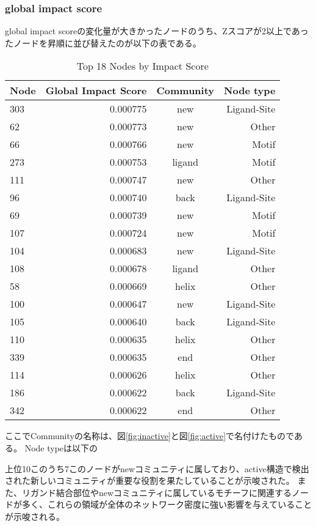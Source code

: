 \subsubsection{global impact score}
global impact scoreの変化量が大きかったノードのうち、Zスコアが2以上であったノードを昇順に並び替えたのが以下の表である。
\begin{table}[ht]
    \centering
    \begin{tabular}{|l|r|c|r|}
    \hline
    \textbf{Node} & \textbf{Global Impact Score} & \textbf{Community} & \textbf{Node type}\\
    \hline
    303 & 0.000775 & new & Ligand-Site \\
    62 & 0.000773 & new & Other \\
    66 & 0.000766 & new & Motif \\
    273 & 0.000753 & ligand & Motif \\
    111 & 0.000747 & new & Other \\
    96 & 0.000740 & back & Ligand-Site \\
    69 & 0.000739 & new & Motif \\
    107 & 0.000724 & new & Motif \\
    104 & 0.000683 & new & Ligand-Site \\
    108 & 0.000678 & ligand & Other \\
    58 & 0.000669 & helix & Other \\
    100 & 0.000647 & new & Ligand-Site \\
    105 & 0.000640 & back & Ligand-Site \\
    110 & 0.000635 & helix & Other \\
    339 & 0.000635 & end & Other \\
    114 & 0.000626 & helix & Other \\
    186 & 0.000622 & back & Ligand-Site \\
    342 & 0.000622 & end & Other \\
    \hline
    \end{tabular}
    \caption{Top 18 Nodes by Impact Score}
\end{table}

ここでCommunityの名称は、図\ref{fig:inactive}と図\ref{fig:active}で名付けたものである。
Node typeは以下の

上位10このうち7このノードがnewコミュニティに属しており、active構造で検出された新しいコミュニティが重要な役割を果たしていることが示唆された。
また、リガンド結合部位やnewコミュニティに属しているモチーフに関連するノードが多く、これらの領域が全体のネットワーク密度に強い影響を与えていることが示唆される。


